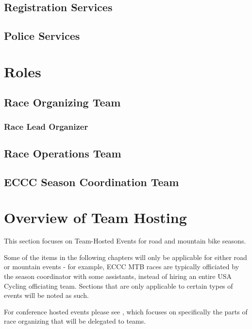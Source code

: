 \documentclass[
  letterpaper, %
  fontsize=10pt, %
  twoside=true,
  chapterentrydots=true, %
  numbers=noenddot,
  fontmethod=tex,
]{kaobook}
\begin{document}
\section{Registration Services}

\section{Police Services}

\setchapterpreamble[u]{\margintoc}
\chapter{Roles}

\section{Race Organizing Team}
\label{role:race_org_team}

\subsection{Race Lead Organizer}
\label{role:lead_org}

\section{Race Operations Team}
\label{role:race_ops_team}

\section{ECCC Season Coordination Team}
\label{role:eccc_coordination_team}



\setchapterpreamble[u]{\margintoc}
\chapter{Overview of Team Hosting}

\begin{kaobox}[title=Scope]
This section focuses on
Team-Hosted Events %
for road and mountain bike seasons.

Some of the items in the following chapters will only be applicable
for either road or mountain events - for example, ECCC MTB races are typically
officiated by the season coordinator with some assistants, instead of hiring an
entire USA Cycling officiating team.
Sections that are only applicable to certain types of events will be noted as such.

For conference hosted events %
please see ,
which focuses on specifically the parts of race organizing
that will be delegated to teams.
\end{kaobox}
\end{document}
